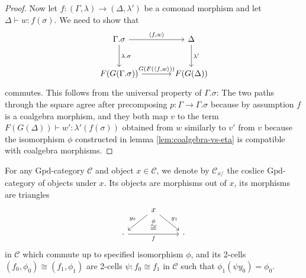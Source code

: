 \documentclass[a4paper]{article}
\theoremstyle{remark}
\theoremstyle{definition}
\begin{document}
\begin{proof}
  Now let $f : (\Gamma, \lambda) \rightarrow (\Delta, \lambda')$ be a comonad morphism and let $\Delta \vdash w : f(\sigma)$.
  We need to show that
  \begin{equation}
    \begin{tikzcd}[column sep=large, row sep=large]
      \Gamma.\sigma \arrow[r, "{\langle f, w \rangle}"] \arrow[d, "\lambda.\sigma"] & \Delta \arrow[d, "\lambda'"] \\
      F(G(\Gamma.\sigma)) \arrow[r, "{G(F(\langle f, w \rangle}))"] & F(G(\Delta))
    \end{tikzcd}
  \end{equation}
  commutes.
  This follows from the universal property of $\Gamma.\sigma$:
  The two paths through the square agree after precomposing $p : \Gamma \rightarrow \Gamma.\sigma$ because by assumption $f$ is a coalgebra morphism, and they both map $v$ to the term $F(G(\Delta)) \vdash w' : \lambda'(f(\sigma))$ obtained from $w$ similarly to $v'$ from $v$ because the isomorphism $\phi$ constructed in lemma \ref{lem:coalgebra-vs-eta} is compatible with coalgebra morphisms.
\end{proof}

For any $\mathrm{Gpd}$-category $\mathcal{C}$ and object $x \in \mathcal{C}$, we denote by $\mathcal{C}_{x / }$ the coslice $\mathrm{Gpd}$-category of objects under $x$.
Its objects are morphisms out of $x$, its morphisms are triangles
\begin{equation}
  \begin{tikzcd}
    & x \arrow[dl, "y_0"'] \arrow[dr, "y_1"] \arrow[d, "\overset{\phi}{\cong}", phantom] & \\
    \cdot \arrow[rr, "f"'] & \, & \cdot
  \end{tikzcd}
\end{equation}
in $\mathcal{C}$ which commute up to specified isomorphism $\phi$, and its 2-cells $(f_0, \phi_0) \cong (f_1, \phi_1)$ are 2-cells $\psi : f_0 \cong f_1$ in $\mathcal{C}$ such that $\phi_1 (\psi y_0) = \phi_0$.
\end{document}
